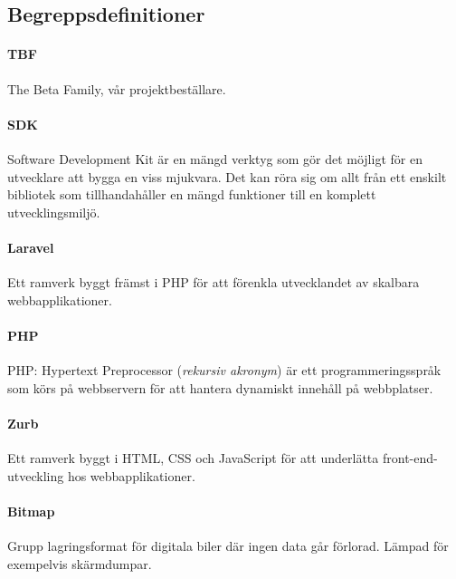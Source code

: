 \subsection{Begreppsdefinitioner}

\paragraph{TBF} The Beta Family, vår projektbeställare.

\paragraph{SDK} Software Development Kit är en mängd verktyg som gör det möjligt för en utvecklare att bygga en viss mjukvara. Det kan röra sig om allt från ett enskilt bibliotek som tillhandahåller en mängd funktioner till en komplett utvecklingsmiljö.

\paragraph{Laravel} Ett ramverk byggt främst i PHP för att förenkla utvecklandet av skalbara webbapplikationer\parencite{laravel}.

\paragraph{PHP} PHP: Hypertext Preprocessor (\textit{rekursiv akronym}) är ett programmeringsspråk som körs på webbservern för att hantera dynamiskt innehåll på webbplatser.

\paragraph{Zurb} Ett ramverk byggt i HTML, CSS och JavaScript för att underlätta front-end-utveckling hos webbapplikationer\parencite{zurb}.

\paragraph{Bitmap} Grupp lagringsformat för digitala biler där ingen data går förlorad. Lämpad för exempelvis skärmdumpar.
